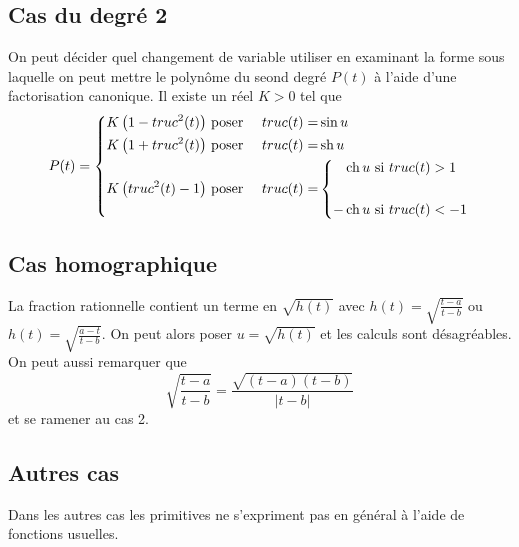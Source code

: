 \subsection{Cas du degré 2}
On peut décider quel changement de variable utiliser en examinant la forme sous laquelle on peut mettre le polynôme du seond degré $P(t)$ à l'aide d'une factorisation canonique. Il existe un réel $K>0$ tel que 
\begin{displaymath}
 P(t)=\left\lbrace
\begin{aligned}
 K\left( 1 - truc^2(t)\right)& \text{ poser }& truc(t)=&\sin u \\ 
 K\left( 1 + truc^2(t)\right)& \text{ poser }& truc(t)=&\mathop{\mathrm{sh}} u \\ 
K\left( truc^2(t) -1 \right)& \text{ poser }& truc(t)=&
\left\lbrace
\begin{aligned}
  \mathop{\mathrm{ch}} u &\text{ si } truc(t)>1\\ \\
  -\mathop{\mathrm{ch}} u &\text{ si } truc(t)<-1
\end{aligned} \right. 
\end{aligned} \right. 
\end{displaymath}

\subsection{Cas homographique}
La fraction rationnelle contient un terme en $\sqrt{h(t)}$ avec  $h(t)=\sqrt{\frac{t-a}{t-b}}$ ou $h(t)=\sqrt{\frac{a-t}{t-b}}$. On peut alors poser $u=\sqrt{h(t)}$ et les calculs sont désagréables. On peut aussi remarquer que 
\begin{displaymath}
 \sqrt{\frac{t-a}{t-b}} = \frac{\sqrt{(t-a)(t-b)}}{|t-b|}
\end{displaymath}
et se ramener au cas 2.
\subsection{Autres cas}
Dans les autres cas les primitives ne s'expriment pas en général à l'aide de fonctions usuelles.

